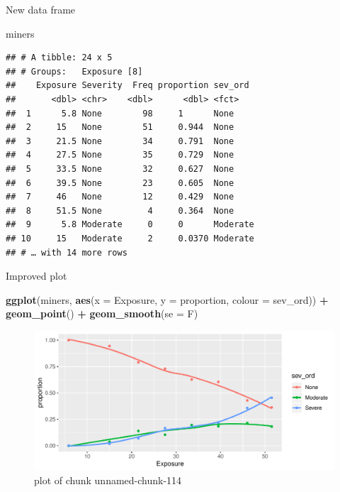 \documentclass[ignorenonframetext,]{beamer}
\newenvironment{Shaded}{\begin{snugshade}}{\end{snugshade}}
\newcommand{\DataTypeTok}[1]{\textcolor[rgb]{0.13,0.29,0.53}{#1}}
\newcommand{\KeywordTok}[1]{\textcolor[rgb]{0.13,0.29,0.53}{\textbf{#1}}}
\newcommand{\NormalTok}[1]{#1}
\newcommand{\OperatorTok}[1]{\textcolor[rgb]{0.81,0.36,0.00}{\textbf{#1}}}
\newcommand{\StringTok}[1]{\textcolor[rgb]{0.31,0.60,0.02}{#1}}
\begin{document}
\begin{frame}[fragile]{New data frame}
\protect\hypertarget{new-data-frame}{}

\small

\begin{Shaded}
\begin{Highlighting}[]
\NormalTok{miners}
\end{Highlighting}
\end{Shaded}

\begin{verbatim}
## # A tibble: 24 x 5
## # Groups:   Exposure [8]
##    Exposure Severity  Freq proportion sev_ord 
##       <dbl> <chr>    <dbl>      <dbl> <fct>   
##  1      5.8 None        98     1      None    
##  2     15   None        51     0.944  None    
##  3     21.5 None        34     0.791  None    
##  4     27.5 None        35     0.729  None    
##  5     33.5 None        32     0.627  None    
##  6     39.5 None        23     0.605  None    
##  7     46   None        12     0.429  None    
##  8     51.5 None         4     0.364  None    
##  9      5.8 Moderate     0     0      Moderate
## 10     15   Moderate     2     0.0370 Moderate
## # … with 14 more rows
\end{verbatim}

\normalsize

\end{frame}

\begin{frame}[fragile]{Improved plot}
\protect\hypertarget{improved-plot}{}

\begin{Shaded}
\begin{Highlighting}[]
\KeywordTok{ggplot}\NormalTok{(miners, }\KeywordTok{aes}\NormalTok{(}\DataTypeTok{x =}\NormalTok{ Exposure, }\DataTypeTok{y =}\NormalTok{ proportion,}
                   \DataTypeTok{colour =}\NormalTok{ sev_ord)) }\OperatorTok{+}\StringTok{ }
\StringTok{  }\KeywordTok{geom_point}\NormalTok{() }\OperatorTok{+}\StringTok{ }\KeywordTok{geom_smooth}\NormalTok{(}\DataTypeTok{se =}\NormalTok{ F)}
\end{Highlighting}
\end{Shaded}

\begin{figure}
\centering
\includegraphics{figure/unnamed-chunk-114-1.pdf}
\caption{plot of chunk unnamed-chunk-114}
\end{figure}

\end{frame}
\end{document}

